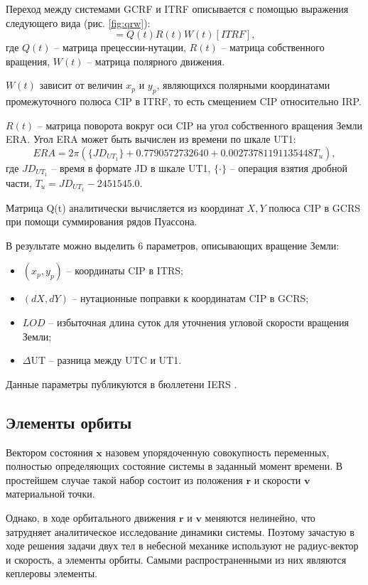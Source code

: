 Переход между системами GCRF и ITRF описывается с помощью выражения следующего вида (рис. \ref{fig:qrw}):
\begin{equation*}
    [GCRF] = Q(t) R(t) W (t) [ITRF],
\end{equation*}
где $Q(t)$ -- матрица прецессии-нутации, $R(t)$ -- матрица собственного вращения, 
$W(t)$ -- матрица полярного движения.

$W(t)$ зависит от величин $x_p$ и $y_p$, являющихся полярными координатами промежуточного
полюса CIP в ITRF, то есть смещением CIP относительно IRP.

$R(t)$ -- матрица поворота вокруг оси CIP на угол собственного вращения Земли ERA.
Угол ERA может быть вычислен из времени по шкале UT1:
\begin{equation*}
    ERA = 2 \pi (\{JD_{UT_1}\} + 0.7790572732640 + 0.00273781191135448 T_u),
\end{equation*}
где $JD_{UT_1}$ -- время в формате JD в шкале UT1, $\{\cdot\}$ -- операция взятия дробной части,
$T_u = JD_{UT_1} - 2451545.0$.

Матрица Q(t) аналитически вычисляется из координат $X, Y$ полюса CIP в GCRS при помощи
суммирования рядов Пуассона.

В результате можно выделить 6 параметров, описывающих вращение Земли:
\begin{itemize}
    \item $(x_p, y_p)$ -- координаты CIP в ITRS;
    \item $(dX, dY)$ -- нутационные поправки к координатам CIP в GCRS;
    \item $LOD$ -- избыточная длина суток для уточнения угловой скорости вращения Земли;
    \item $\Delta$UT -- разница между UTC и UT1.
\end{itemize}

Данные параметры публикуются в бюллетени IERS \cite{Petit2010}.

\subsection{Элементы орбиты}
Вектором состояния $\mathbf{x}$ назовем упорядоченную совокупность переменных, полностью определяющих состояние системы в заданный момент времени.
В простейшем случае такой набор состоит из положения $\mathbf{r}$ и скорости $\mathbf{v}$ материальной точки. 

Однако, в ходе орбитального движения $\mathbf{r}$ и $\mathbf{v}$ меняются нелинейно,
что затрудняет аналитическое исследование динамики системы.
Поэтому зачастую в ходе решения задачи двух тел в небесной механике используют не радиус-вектор и скорость, а элементы орбиты.
Самыми распространенными из них являются кеплеровы элементы. 

